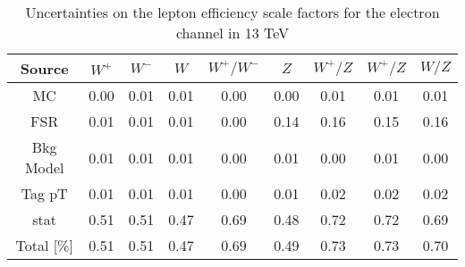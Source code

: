 \begin{table}[htbp]
\begin{center}
\begin{tabular}{ccccccccc}
\hline
Source & $W^+$& $W^-$ & $W$ & $W^+/W^-$ & $Z$ & $W^+/Z$&$W^+/Z$ &$W/Z$  \\
\hline \hline
MC & 0.00 & 0.01 & 0.01 & 0.00 & 0.00 & 0.01 & 0.01 & 0.01 \\
FSR & 0.01 & 0.01 & 0.01 & 0.00 & 0.14 & 0.16 & 0.15 & 0.16 \\
Bkg Model & 0.01 & 0.01 & 0.01 & 0.00 & 0.01 & 0.00 & 0.01 & 0.00 \\
Tag pT & 0.01 & 0.01 & 0.01 & 0.00 & 0.01 & 0.02 & 0.02 & 0.02 \\
stat & 0.51 & 0.51 & 0.47 & 0.69 & 0.48 & 0.72 & 0.72 & 0.69 \\
\hline \hline
Total [\%] & 0.51 & 0.51 & 0.47 & 0.69 & 0.49 & 0.73 & 0.73 & 0.70 \\

\end{tabular}
\end{center}
\caption{Uncertainties on the lepton efficiency scale factors for the electron channel in 13 TeV}
\label{tab:Eff:Unc:ele:summary:13}
\end{table}